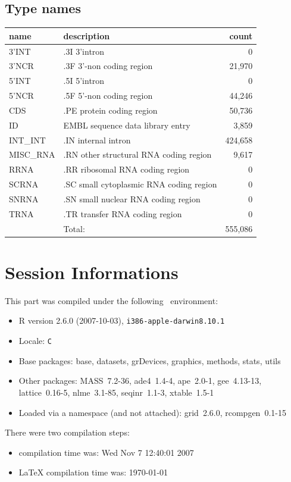 \documentclass{article}
\begin{document}
\begin{Schunk}
\subsection{Type names}
\noindent\begin{tabular}{llr}
\hline \hline
name & description & count \\
\hline
3'INT  &  .3I 3'intron  &  0 \\
3'NCR  &  .3F  3'-non coding region  &  21,970 \\
5'INT  &  .5I 5'intron  &  0 \\
5'NCR  &  .5F  5'-non coding region  &  44,246 \\
CDS  &  .PE protein coding region  &  50,736 \\
ID  &  EMBL sequence data library entry  &  3,859 \\
INT\_INT  &  .IN  internal intron  &  424,658 \\
MISC\_RNA  &  .RN other structural RNA coding region  &  9,617 \\
RRNA  &  .RR ribosomal RNA coding region  &  0 \\
SCRNA  &  .SC small cytoplasmic RNA coding region  &  0 \\
SNRNA  &  .SN small nuclear RNA coding region  &  0 \\
TRNA  &  .TR transfer RNA coding region  &  0 \\
\hline
 & Total: & 555,086 \\
\hline \hline
\end{tabular}\end{Schunk}


\section*{Session Informations}

This part was compiled under the following \Rlogo{}~environment:

\begin{itemize}
  \item R version 2.6.0 (2007-10-03), \verb|i386-apple-darwin8.10.1|
  \item Locale: \verb|C|
  \item Base packages: base, datasets, grDevices, graphics, methods,
    stats, utils
  \item Other packages: MASS~7.2-36, ade4~1.4-4, ape~2.0-1,
    gee~4.13-13, lattice~0.16-5, nlme~3.1-85, seqinr~1.1-3,
    xtable~1.5-1
  \item Loaded via a namespace (and not attached): grid~2.6.0,
    rcompgen~0.1-15
\end{itemize}
There were two compilation steps:

\begin{itemize}
  \item \Rlogo{} compilation time was: Wed Nov  7 12:40:01 2007
  \item \LaTeX{} compilation time was: \today
\end{itemize}


\clearpage
{}


\end{document}
